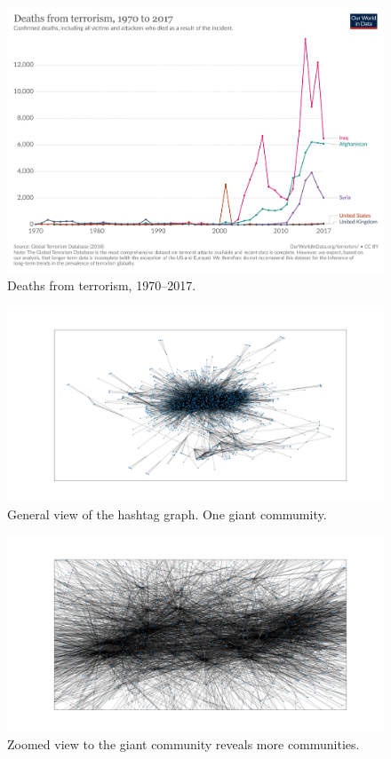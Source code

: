 \documentclass[conference]{IEEEtran}
\begin{document}
\begin{figure}
\includegraphics[scale=0.15]{figures/fatalities-from-terrorism}
    \caption{Deaths from terrorism, 1970--2017.}
    \label{fig:appendix_terrorism_deaths}
\end{figure}\label{subsec:data-verification-after-some-pre-processing-methods}

\begin{figure}
    \includegraphics[scale=0.32]{figures/general_graph}
    \caption{General view of the hashtag graph. One giant commumity.}
    \label{fig:graph-general}
\end{figure}

\begin{figure}
    \includegraphics[scale=0.32]{figures/general_graph_zoomed}
    \caption{Zoomed view to the giant community reveals more communities.}
    \label{fig:graph-general-zoomed}
\end{figure}
\end{document}
